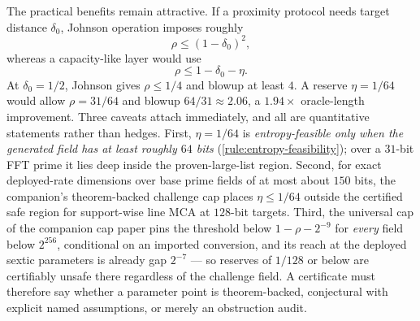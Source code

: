 \documentclass[11pt]{article}
\theoremstyle{definition}
\begin{document}
The practical benefits remain attractive.  If a proximity protocol needs target distance $\delta_0$, Johnson operation imposes roughly
\[
        \rho\le (1-\delta_0)^2,
\]
whereas a capacity-like layer would use
\[
        \rho\le 1-\delta_0-\eta .
\]
At $\delta_0=1/2$, Johnson gives $\rho\le1/4$ and blowup at least $4$.  A reserve $\eta=1/64$ would allow $\rho=31/64$ and blowup $64/31\approx2.06$, a $1.94\times$ oracle-length improvement.  Three caveats attach immediately, and all are quantitative statements rather than hedges.  First, $\eta=1/64$ is \emph{entropy-feasible only when the generated field has at least roughly $64$ bits} (\cref{rule:entropy-feasibility}); over a $31$-bit FFT prime it lies deep inside the proven-large-list region.  Second, for exact deployed-rate dimensions over base prime fields of at most about $150$ bits, the companion's theorem-backed challenge cap places $\eta\le1/64$ outside the certified safe region for support-wise line MCA at $128$-bit targets.  Third, the universal cap of the companion cap paper \cite{UniversalCap} pins the threshold below $1-\rho-2^{-9}$ for \emph{every} field below $2^{256}$, conditional on an imported conversion, and its reach at the deployed sextic parameters is already gap $2^{-7}$ --- so reserves of $1/128$ or below are certifiably unsafe there regardless of the challenge field.  A certificate must therefore say whether a parameter point is theorem-backed, conjectural with explicit named assumptions, or merely an obstruction audit.
\end{document}
